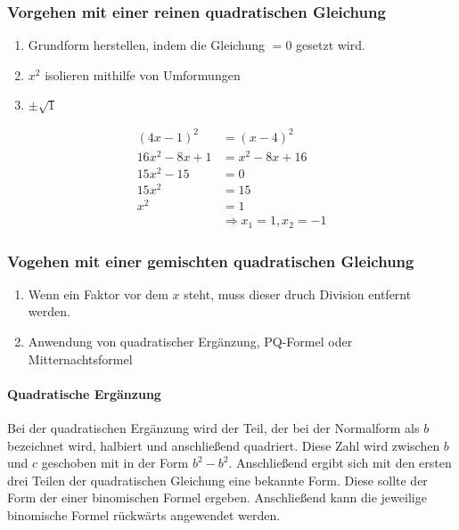 \subsubsection{Vorgehen mit einer reinen quadratischen Gleichung}
\begin{enumerate}
	\item Grundform herstellen, indem die Gleichung $=0$ gesetzt wird.
	\item $x^2$ isolieren mithilfe von Umformungen
	\item $\pm\sqrt{1}$
\end{enumerate}
\begin{beispiel}
	\begin{align*}
		(4x-1)^2&=(x-4)^2\\
		16x^2-8x+1&=x^2-8x+16\\
		15x^2-15&=0\\
		15x^2&=15\\
		x^2&=1\\
		&\Rightarrow x_1=1, x_2=-1
	\end{align*}
\end{beispiel}
\subsubsection{Vogehen mit einer gemischten quadratischen Gleichung}
\begin{enumerate}
	\item Wenn ein Faktor vor dem $x$ steht, muss dieser druch Division entfernt werden. 
	\item Anwendung von quadratischer Ergänzung, PQ-Formel oder Mitternachtsformel
\end{enumerate}
\paragraph{Quadratische Ergänzung} Bei der quadratischen Ergänzung wird der Teil, der bei der Normalform als $b$ bezeichnet wird, halbiert und anschließend quadriert. Diese Zahl wird zwischen $b$ und $c$ geschoben mit in der Form $b^2-b^2$. Anschließend ergibt sich mit den ersten drei Teilen der quadratischen Gleichung eine bekannte Form. Diese sollte der Form der einer binomischen Formel ergeben. Anschließend kann die jeweilige binomische Formel rückwärts angewendet werden. 

